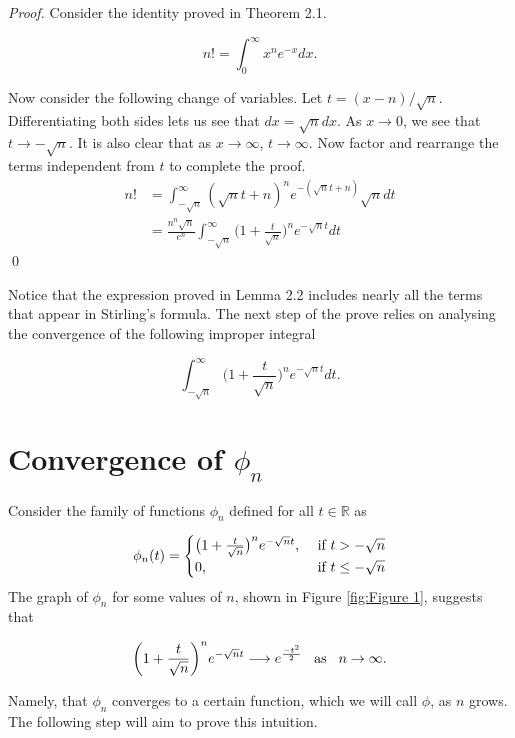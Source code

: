 \documentclass[12pt]{article}
\begin{document}
\noindent \textit{Proof.} Consider the identity proved in Theorem 2.1.

$$n!=\int_0^\infty x^ne^{-x}dx.$$

\noindent Now consider the following change of variables. Let $t=(x-n)/\sqrt{n}$. Differentiating both sides lets us see that $dx=\sqrt{n} dx$. As $x\to0$, we see that $t\to -\sqrt{n}$. It is also clear that as $x\to \infty$, $t\to \infty$. Now factor and rearrange the terms independent from $t$ to complete the proof. 
\begin{align*}
       n!&=\int_{-\sqrt{n}}^\infty (\sqrt{n}t+n)^ne^{-(\sqrt{n}t+n)}\sqrt{n}dt \\
&=\frac{n^n\sqrt{n}}{e^n}\int_{-\sqrt{n}}^\infty \bigg( 1+\frac{t}{\sqrt{n}}\bigg)^ne^{-\sqrt{n}t}dt
\end{align*}
\qed

\vspace{3mm}

\noindent Notice that the expression proved in Lemma 2.2 includes nearly all the terms that appear in Stirling's formula. The next step of the prove relies on analysing the convergence of the following improper integral 

$$\int_{-\sqrt{n}}^\infty \bigg( 1+\frac{t}{\sqrt{n}}\bigg)^ne^{-\sqrt{n}t}dt.$$

\section{Convergence of $\phi_n$}

\noindent Consider the family of functions $\phi_n$ defined for all $t\in\mathbb{R}$ as

\[ \phi_n (t) = \begin{cases}
  \big( 1+\frac{t}{\sqrt{n}}\big)^ne^{-\sqrt{n}t}, & \mbox{ if $ t>-\sqrt{n} $}\\
  0, & \mbox{ if $ t \leq -\sqrt{n} $}
  \end{cases}
  \]
\noindent The graph of $\phi_n$ for some values of $n$, shown in Figure \ref{fig:Figure 1}, suggests that

$$\bigg( 1+\frac{t}{\sqrt{n}}\bigg)^ne^{-\sqrt{n}t}\longrightarrow{}e^{\frac{-t^2}{2}} \hspace{3mm} \text{as}\hspace{3mm} n\to\infty.$$

\noindent Namely, that $\phi_n$ converges to a certain function, which we will call $\phi$, as $n$ grows. The following step will aim to prove this intuition.
\end{document}
